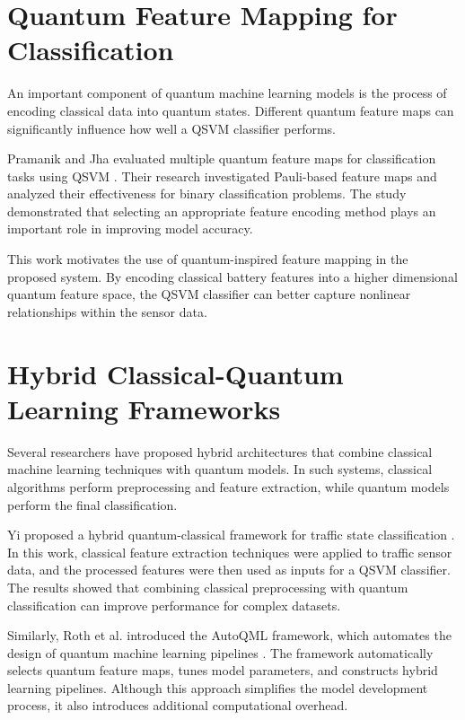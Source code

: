 \section{Quantum Feature Mapping for Classification}

An important component of quantum machine learning models is the process of encoding classical data into quantum states. Different quantum feature maps can significantly influence how well a QSVM classifier performs.

Pramanik and Jha evaluated multiple quantum feature maps for classification tasks using QSVM \cite{qsvm_forest_classification_2025}. Their research investigated Pauli-based feature maps and analyzed their effectiveness for binary classification problems. The study demonstrated that selecting an appropriate feature encoding method plays an important role in improving model accuracy.

This work motivates the use of quantum-inspired feature mapping in the proposed system. By encoding classical battery features into a higher dimensional quantum feature space, the QSVM classifier can better capture nonlinear relationships within the sensor data.

\section{Hybrid Classical-Quantum Learning Frameworks}

Several researchers have proposed hybrid architectures that combine classical machine learning techniques with quantum models. In such systems, classical algorithms perform preprocessing and feature extraction, while quantum models perform the final classification.

Yi proposed a hybrid quantum-classical framework for traffic state classification \cite{hybrid_quantum_traffic_2025}. In this work, classical feature extraction techniques were applied to traffic sensor data, and the processed features were then used as inputs for a QSVM classifier. The results showed that combining classical preprocessing with quantum classification can improve performance for complex datasets.

Similarly, Roth et al. introduced the AutoQML framework, which automates the design of quantum machine learning pipelines \cite{autoqml_framework_2025}. The framework automatically selects quantum feature maps, tunes model parameters, and constructs hybrid learning pipelines. Although this approach simplifies the model development process, it also introduces additional computational overhead.

